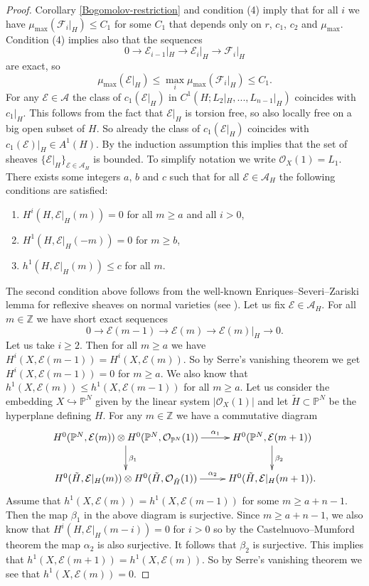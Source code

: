 \documentclass[12pt]{article}
\theoremstyle{plain}
\theoremstyle{definition}
\theoremstyle{remark}
\newcommand{\ZZ}{{\mathbb Z}}
\newcommand{\PP}{{\mathbb P}}
\newcommand{\cA}{{\mathcal A}}
\newcommand{\cE}{{\mathcal E}}
\newcommand{\cF}{{\mathcal F}}
\newcommand{\cO}{{\mathcal O}}
\begin{document}
\begin{proof}
Corollary \ref{Bogomolov-restriction} and condition (4) imply that for all $i$ we have
$\mu _{\max} (\cF_i|_{H})  \le C_1$
for some $C_1$ that depends only on $r$, $c_1$, $c_2$ and $\mu_{\max}$.
Condition (4) implies also that the sequences
$$0\to \cE_{i-1}|_H\to \cE_i|_H\to \cF_i|_H$$
are exact, so
$$	\mu _{\max} (\cE|_{H})\le \max _i	\mu _{\max} (\cF_i|_{H}) \le C_1.$$
For any $\cE\in \cA$ the class of $c_1(\cE|_H)$ in $C^1(H;L_2|_H,...,L_{n-1}|_H)$ coincides with $c_1|_H$.
This follows from the fact that $\cE|_H$ is torsion free, so also locally free on a big open subset of $H$.
So already the class of $c_1(\cE|_H)$ coincides with $c_1(\cE)|_H\in A^1(H)$.
By the induction assumption this implies that the set of sheaves $\{\cE|_H\}_{\cE\in \cA_H}$ is bounded.
To simplify notation we write $\cO_X(1)=L_1$.
There exists some integers $a$, $b$ and $c$ such that for all $\cE\in \cA_H$  the following conditions are satisfied:
\begin{enumerate}
	\item $H^i (H, \cE |_H(m))=0$ for all $m\ge a$ and all $i>0$,
	\item $H^1 (H, \cE |_H(-m))=0$ for $m\ge b$,
	\item  $h^1 (H, \cE |_H(m))\le c$ for all $m$.
\end{enumerate}
The second condition above follows from the well-known Enriques--Severi--Zariski lemma for reflexive sheaves on normal varieties (see \cite[Lemma 0FD8]{SP}). 
Let us fix $\cE\in \cA_H$.
For all $m\in \ZZ$ we have short exact sequences
$$0\to \cE({m-1})\to \cE (m)\to \cE(m)|_{H} \to 0.$$
Let us take $i\ge 2$. Then for all $m\ge a$ we have $H^i (X, \cE (m-1))=H^i (X, \cE (m))$. So by Serre's vanishing theorem we get $H^i (X, \cE (m-1))=0$ for $m\ge a$.
We also know that $h^1 (X, \cE (m))\le h^1 (X, \cE (m-1))$ for all $m\ge a$. 
Let us consider the embedding $X\hookrightarrow \PP^N$ given by the linear system $|\cO_{X}(1)|$
and let $\tilde H\subset \PP^N$ be the hyperplane defining $H$. For any $m\in \ZZ$ we have a commutative diagram
$$\xymatrix{
	H^0(\PP^N, \cE (m))\otimes 	H^0(\PP^N, \cO_{\PP^N} (1))\ar[d]^{\beta_1}\ar[r]^-{\alpha_1}& 	H^0(\PP^N, \cE (m+1))\ar[d]^{\beta_2}\\
	H^0(\tilde H, \cE|_H (m))\otimes 	H^0(\tilde H, \cO_{\tilde H} (1))\ar[r]^-{\alpha_2}& 	H^0(\tilde H, \cE|_H (m+1)).\\
}
$$
Assume that $h^1 (X, \cE (m))= h^1 (X, \cE (m-1))$ for some $m\ge a+n-1$. Then the map $\beta_1$ in the above diagram is surjective. Since $m\ge a+n-1$, we also know that $H^i (H, \cE|_H(m-i))=0$ for $i>0$ so by the Castelnuovo--Mumford theorem the map $\alpha_2$ is also surjective. It follows that $\beta _2$ is surjective. This implies that $h^1 (X, \cE (m+1))= h^1 (X, \cE (m))$. So by Serre's vanishing theorem we see that  $h^1 (X, \cE (m))=0$.

\end{proof}
\end{document}
